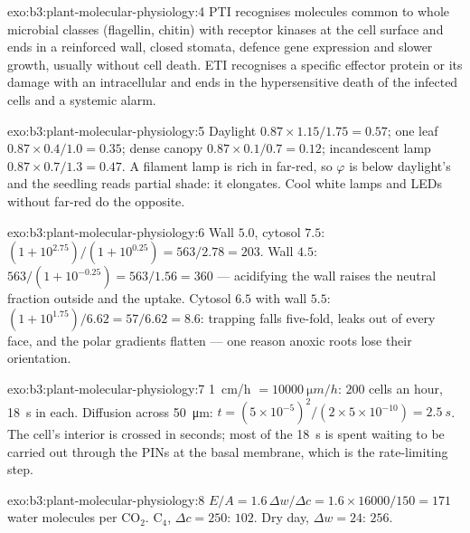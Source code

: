 \begin{solution}{exo:b3:plant-molecular-physiology:4}
PTI recognises molecules common to whole microbial classes
(flagellin, chitin) with receptor kinases at the cell surface and ends
in a reinforced wall, closed stomata, defence gene expression and
slower growth, usually without cell death. ETI recognises a specific
effector protein or its damage with an intracellular  and
ends in the hypersensitive death of the infected cells and a systemic
alarm.
\end{solution}

\begin{solution}{exo:b3:plant-molecular-physiology:5}
Daylight $0.87\times 1.15/1.75 = 0.57$; one leaf $0.87\times 0.4/1.0 =
0.35$; dense canopy $0.87\times 0.1/0.7 = 0.12$; incandescent lamp
$0.87\times 0.7/1.3 = 0.47$. A filament lamp is rich in far-red, so
$\varphi$ is below daylight's and the seedling reads partial shade:
it elongates. Cool white lamps and LEDs without far-red do the
opposite.
\end{solution}

\begin{solution}{exo:b3:plant-molecular-physiology:6}
Wall $5.0$, cytosol $7.5$: $(1 + 10^{2.75})/(1 + 10^{0.25}) = 563/2.78
= 203$. Wall $4.5$: $563/(1 + 10^{-0.25}) = 563/1.56 = 360$ ---
acidifying the wall raises the neutral fraction outside and the uptake.
Cytosol $6.5$ with wall $5.5$: $(1 + 10^{1.75})/6.62 = 57/6.62 = 8.6$:
trapping falls five-fold,  leaks out of every face, and the polar
gradients flatten --- one reason anoxic roots lose their orientation.
\end{solution}

\begin{solution}{exo:b3:plant-molecular-physiology:7}
\qty{1}{cm/h} $= \qty{10000}{\micro m/h}$: $200$ cells an hour,
\qty{18}{s} in each. Diffusion across \qty{50}{\micro m}: $t =
(5\times 10^{-5})^{2}/(2\times 5\times 10^{-10}) = \qty{2.5}{s}$. The
cell's interior is crossed in seconds; most of the \qty{18}{s} is
spent waiting to be carried out through the PINs at the basal
membrane, which is the rate-limiting step.
\end{solution}

\begin{solution}{exo:b3:plant-molecular-physiology:8}
$E/A = 1.6\,\Delta w/\Delta c = 1.6\times\num{16000}/150 = 171$ water
molecules per CO$_{2}$. C$_{4}$, $\Delta c = 250$: $102$. Dry day,
$\Delta w = 24$: $256$.
\end{solution}

